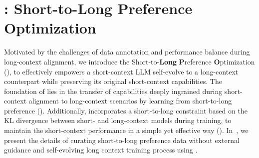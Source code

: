 \section{\ourMethod: Short-to-Long Preference Optimization}
\label{sec:method}





Motivated by the challenges of data annotation and performance balance during long-context alignment, we introduce the Short-to-\textbf{Long} \textbf{P}reference \textbf{O}ptimization (\textbf{\ourMethod}), to effectively empowers a short-context LLM self-evolve to a long-context counterpart while preserving its original short-context capabilities. 
The foundation of \ourMethod{} lies in the transfer of capabilities deeply ingrained during short-context alignment to long-context scenarios by learning from short-to-long preference (). Additionally, \ourMethod{} incorporates a short-to-long constraint based on the KL divergence between short- and long-context models during training, to maintain the short-context performance in a simple yet effective way (). In~, we present the details of curating short-to-long preference data without external guidance and self-evolving long context training process using \ourMethod.










